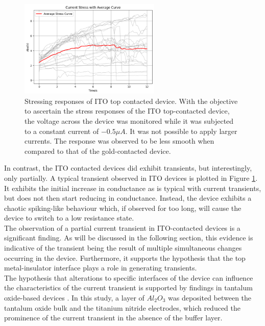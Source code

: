 \begin{figure}[htbp!] 
\centering    
\includegraphics[width=0.6\textwidth]{Chapter5/Figs/a.png}
\caption[Stressing responses of ITO top contacted device.]{Stressing responses of ITO top contacted device. With the objective to ascertain the stress responses of the ITO top-contacted device, the voltage across the device was monitored while it was subjected to a constant current of $-0.5\mu A$. It was not possible to apply larger currents. The response was observed to be less smooth when compared to that of the gold-contacted device.}
\label{fig:5a}
\end{figure}

\noindent In contrast, the ITO contacted devices did exhibit transients, but interestingly, only partially. A typical transient observed in ITO devices is plotted in Figure \ref{fig:5a}. It exhibits the initial increase in conductance as is typical with current transients, but does not then start reducing in conductance. Instead, the device exhibits a chaotic spiking-like behaviour which, if observed for too long, will cause the device to switch to a low resistance state.\\

\noindent The observation of a partial current transient in ITO-contacted devices is a significant finding. As will be discussed in the following section, this evidence is indicative of the transient being the result of multiple simultaneous changes occurring in the device. Furthermore, it supports the hypothesis that the top metal-insulator interface plays a role in generating transients.\\

\noindent The hypothesis that alterations to specific interfaces of the device can influence the characteristics of the current transient is supported by findings in tantalum oxide-based devices \cite{tuller2011point}. In this study, a layer of $Al_2O_3$ was deposited between the tantalum oxide bulk and the titanium nitride electrodes, which reduced the prominence of the current transient in the absence of the buffer layer.\\

